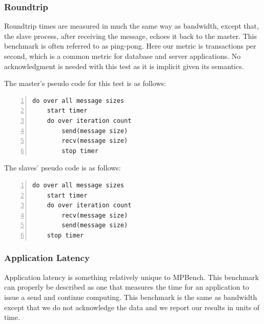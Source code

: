 \subsubsection{Roundtrip}

Roundtrip times are measured in much the same way as bandwidth, except that,
the slave process, after receiving the message, echoes it back to the master.
This benchmark is often referred to as ping-pong. Here our metric is
transactions per second, which is a common metric for database and server
applications. No acknowledgment is needed with this test as it is implicit
given its semantics.

The master's pseudo code for this test is as follows:

\begin{minipage}{\textwidth}
\end{minipage}

\begin{minipage}{\textwidth}
\begin{lstlisting}[frame=single,numbers=left]
  do over all message sizes 
    start timer
    do over iteration count
        send(message size)
        recv(message size) 
        stop timer
\end{lstlisting}
\end{minipage}

The slaves' pseudo code is as follows:

\begin{minipage}{\textwidth}
\end{minipage}

\begin{minipage}{\textwidth}
\begin{lstlisting}[frame=single,numbers=left]
do over all message sizes 
    start timer
    do over iteration count
        recv(message size)
        send(message size)
    stop timer
\end{lstlisting}
\end{minipage}

\subsubsection{Application Latency}

Application latency is something relatively unique to MPBench. This benchmark
can properly be described as one that measures the time for an application
to issue a send and continue computing. This benchmark is the same as
bandwidth except that we do not acknowledge the data and we report our
results in units of time.

